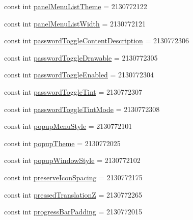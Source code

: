 \begin{DoxyCompactItemize}
const int \mbox{\hyperlink{class_f_w_p_s___app_1_1_droid_1_1_resource_1_1_attribute_a2a5ceff2cdd57d1710481598d44f3e82}{panel\+Menu\+List\+Theme}} = 2130772122
\item 
const int \mbox{\hyperlink{class_f_w_p_s___app_1_1_droid_1_1_resource_1_1_attribute_a97eac775573ae6d3bf23de5589083110}{panel\+Menu\+List\+Width}} = 2130772121
\item 
const int \mbox{\hyperlink{class_f_w_p_s___app_1_1_droid_1_1_resource_1_1_attribute_abda28e3950a3e70b36a9cb87e789b3d9}{password\+Toggle\+Content\+Description}} = 2130772306
\item 
const int \mbox{\hyperlink{class_f_w_p_s___app_1_1_droid_1_1_resource_1_1_attribute_a7f911a8c98133a9aabff20774183f730}{password\+Toggle\+Drawable}} = 2130772305
\item 
const int \mbox{\hyperlink{class_f_w_p_s___app_1_1_droid_1_1_resource_1_1_attribute_a85b1d6a646acfddaf238dc1e31cd736b}{password\+Toggle\+Enabled}} = 2130772304
\item 
const int \mbox{\hyperlink{class_f_w_p_s___app_1_1_droid_1_1_resource_1_1_attribute_a25cfbc59072a8c56a99126fdcda14130}{password\+Toggle\+Tint}} = 2130772307
\item 
const int \mbox{\hyperlink{class_f_w_p_s___app_1_1_droid_1_1_resource_1_1_attribute_a34520f5b5d4752e22bf442d4200085fa}{password\+Toggle\+Tint\+Mode}} = 2130772308
\item 
const int \mbox{\hyperlink{class_f_w_p_s___app_1_1_droid_1_1_resource_1_1_attribute_a3291e65a6bff892baf38b41a4f558662}{popup\+Menu\+Style}} = 2130772101
\item 
const int \mbox{\hyperlink{class_f_w_p_s___app_1_1_droid_1_1_resource_1_1_attribute_a3e058e25112e376eed552138ccf569b4}{popup\+Theme}} = 2130772025
\item 
const int \mbox{\hyperlink{class_f_w_p_s___app_1_1_droid_1_1_resource_1_1_attribute_ad71e64dc463f3d5b3eb006da0dfe8b23}{popup\+Window\+Style}} = 2130772102
\item 
const int \mbox{\hyperlink{class_f_w_p_s___app_1_1_droid_1_1_resource_1_1_attribute_a01fbdc4790f575a958a2ed892af83ee6}{preserve\+Icon\+Spacing}} = 2130772175
\item 
const int \mbox{\hyperlink{class_f_w_p_s___app_1_1_droid_1_1_resource_1_1_attribute_a6ea6682bf15c3d3ab1adbabe5c590465}{pressed\+TranslationZ}} = 2130772265
\item 
const int \mbox{\hyperlink{class_f_w_p_s___app_1_1_droid_1_1_resource_1_1_attribute_aa2753d9fbbe70fd5360827f7bf49442c}{progress\+Bar\+Padding}} = 2130772015

\end{DoxyCompactItemize}
